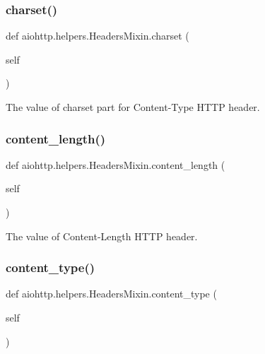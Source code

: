 \subsubsection{\texorpdfstring{charset()}{charset()}}
{\footnotesize\ttfamily def aiohttp.\+helpers.\+Headers\+Mixin.\+charset (\begin{DoxyParamCaption}\item[{}]{self }\end{DoxyParamCaption})}

\begin{DoxyVerb}The value of charset part for Content-Type HTTP header.\end{DoxyVerb}
 \mbox{\label{classaiohttp_1_1helpers_1_1_headers_mixin_a88e587821ae34d8f6c8608f8d8b48d93}} 
\subsubsection{\texorpdfstring{content\+\_\+length()}{content\_length()}}
{\footnotesize\ttfamily def aiohttp.\+helpers.\+Headers\+Mixin.\+content\+\_\+length (\begin{DoxyParamCaption}\item[{}]{self }\end{DoxyParamCaption})}

\begin{DoxyVerb}The value of Content-Length HTTP header.\end{DoxyVerb}
 \mbox{\label{classaiohttp_1_1helpers_1_1_headers_mixin_a2eefac14c847b3349d202930afe4035c}} 
\subsubsection{\texorpdfstring{content\+\_\+type()}{content\_type()}}
{\footnotesize\ttfamily def aiohttp.\+helpers.\+Headers\+Mixin.\+content\+\_\+type (\begin{DoxyParamCaption}\item[{}]{self }\end{DoxyParamCaption})}

